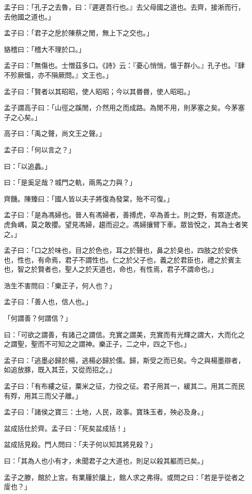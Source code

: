 \documentclass[12pt,a4paper]{ctexbook}
\begin{document}
孟子曰：「孔子之去魯，曰：『遲遲吾行也。』去父母國之道也。去齊，接淅而行，去他國之道也。」\par
孟子曰：「君子之戹於陳蔡之閒，無上下之交也。」\par
貉稽曰：「稽大不理於口。」\par
孟子曰：「無傷也。士憎茲多口。《詩》云：『憂心悄悄，慍于群小。』孔子也。『肆不殄厥慍，亦不隕厥問。』文王也。」\par
孟子曰：「賢者以其昭昭，使人昭昭；今以其昬昬，使人昭昭。」\par
孟子謂高子曰：「山徑之蹊閒，介然用之而成路。為閒不用，則茅塞之矣。今茅塞子之心矣。」\par
高子曰：「禹之聲，尚文王之聲。」\par
孟子曰：「何以言之？」\par
曰：「以追蠡。」\par
曰：「是奚足哉？城門之軌，兩馬之力與？」\par
齊饑。陳臻曰：「國人皆以夫子將復為發棠，殆不可復。」\par
孟子曰：「是為馮婦也。晉人有馮婦者，善搏虎，卒為善士。則之野，有眾逐虎。虎負嵎，莫之敢攖。望見馮婦，趨而迎之。馮婦攘臂下車。眾皆悅之，其為士者笑之。」\par
孟子曰：「口之於味也，目之於色也，耳之於聲也，鼻之於臭也，四肢之於安佚也，性也，有命焉，君子不謂性也。仁之於父子也，義之於君臣也，禮之於賓主也，智之於賢者也，聖人之於天道也，命也，有性焉，君子不謂命也。」\par
浩生不害問曰：「樂正子，何人也？」\par
孟子曰：「善人也，信人也。」\par
「何謂善？何謂信？」\par
曰：「可欲之謂善，有諸己之謂信。充實之謂美，充實而有光輝之謂大，大而化之之謂聖，聖而不可知之之謂神。樂正子，二之中，四之下也。」\par
孟子曰：「逃墨必歸於楊，逃楊必歸於儒。歸，斯受之而已矣。今之與楊墨辯者，如追放豚，既入其苙，又從而招之。」\par
孟子曰：「有布縷之征，粟米之征，力役之征。君子用其一，緩其二。用其二而民有殍，用其三而父子離。」\par
孟子曰：「諸侯之寶三：土地，人民，政事。寶珠玉者，殃必及身。」\par
盆成括仕於齊。孟子曰：「死矣盆成括！」\par
盆成括見殺。門人問曰：「夫子何以知其將見殺？」\par
曰：「其為人也小有才，未聞君子之大道也，則足以殺其軀而已矣。」\par
孟子之滕，館於上宮。有業屨於牖上，館人求之弗得。或問之曰：「若是乎從者之廀也？」\par
\end{document}
